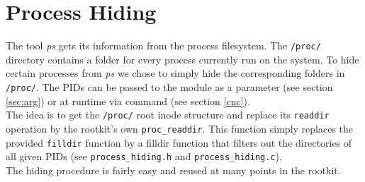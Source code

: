 \section{Process Hiding}
The tool \textit{ps} gets its information from the process filesystem. The 
\texttt{/proc/} directory contains a folder for every process 
currently run on the system. To hide certain processes from \textit{ps} we chose 
to simply hide the corresponding folders in \texttt{/proc/}. 
The PIDs can be passed to the module as a parameter (see section \ref{sec:arg}) or at runtime via command 
(see section \ref{cnc}). 
\\
The idea is to get the \texttt{/proc/} root inode structure and replace its 
\texttt{readdir} operation by the rootkit's own
\texttt{proc\_readdir}. This function simply replaces the provided 
\texttt{filldir} function by a filldir function that filters out the 
directories of all given PIDs (see \verb+process_hiding.h+ and \verb+process_hiding.c+).\\
The hiding procedure is fairly easy and reused at many points 
in the rootkit. 
